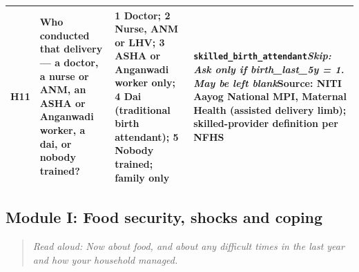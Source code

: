 \documentclass[10pt]{article}
\begin{document}
{\begin{longtable}{p{0.8cm}p{6.4cm}p{3.6cm}p{5.8cm}}
H11 & Who conducted that delivery — a doctor, a nurse or ANM, an ASHA or Anganwadi worker, a dai, or nobody trained? & 1 Doctor; 2 Nurse, ANM or LHV; 3 ASHA or Anganwadi worker only; 4 Dai (traditional birth attendant); 5 Nobody trained; family only & \texttt{skilled\_birth\_attendant}\newline \textit{Skip: Ask only if birth\_last\_5y = 1. May be left blank}\newline Source: NITI Aayog National MPI, Maternal Health (assisted delivery limb); skilled-provider definition per NFHS \\
\bottomrule
\end{longtable}
}
\subsection*{Module I: Food security, shocks and coping}
\begin{quote}\small\textit{Read aloud: Now about food, and about any difficult times in the last year and how your household managed.}\end{quote}
\end{document}
